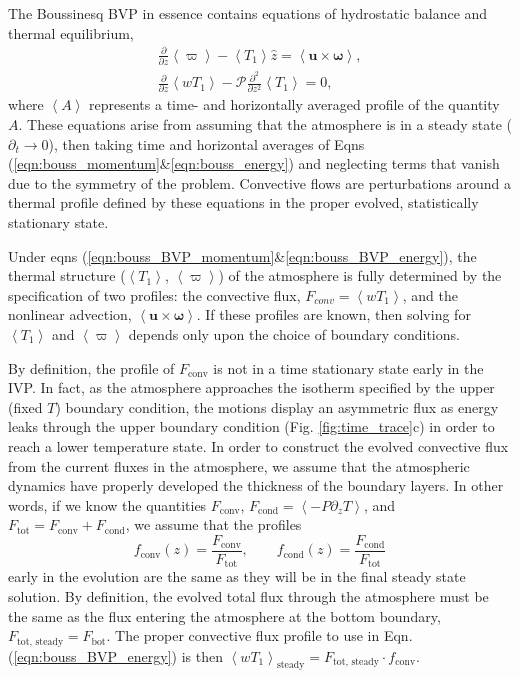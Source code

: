 \documentclass[aps, pre, onecolumn, nofootinbib, notitlepage, groupedaddress, amsfonts, amssymb, amsmath, longbibliography]{revtex4-1}
\newcommand{\angles}[1]{\ensuremath{\left\langle #1 \right\rangle}}
\begin{document}
The Boussinesq BVP in essence contains equations of hydrostatic balance and thermal equilibrium,
\begin{gather}
\frac{\partial}{\partial z}\angles{\varpi} - \angles{T_1}\hat{z} = \angles{\bm{u}\times\bm{\omega}},
	\label{eqn:bouss_BVP_momentum}
\\
\frac{\partial}{\partial z}\angles{wT_1} - \mathcal{P}\frac{\partial^2}{\partial z^2} \angles{T_1} = 0,
	\label{eqn:bouss_BVP_energy}
\end{gather}
where $\angles{A}$ represents a time- and horizontally averaged profile of the quantity $A$.  
These
equations arise from assuming that the atmosphere is in a steady state ($\partial_t \rightarrow 0$),
then taking time and horizontal averages of Eqns (\ref{eqn:bouss_momentum}\&\ref{eqn:bouss_energy}) and
neglecting terms that vanish due to the symmetry of the problem.
Convective flows
are perturbations around a thermal profile defined by these equations in the proper evolved, statistically stationary state.

Under eqns (\ref{eqn:bouss_BVP_momentum}\&\ref{eqn:bouss_BVP_energy}), 
the thermal structure ($\angles{T_1}$, $\angles{\varpi}$) of the atmosphere is fully determined by the specification
of two profiles: the convective flux, $F_{conv} = \angles{w T_1}$, and the nonlinear advection, $\angles{\bm{u}\times\bm{\omega}}$.  
If these profiles are known, then 
solving for $\angles{T_1}$ and
$\angles{\varpi}$ depends only upon the choice of boundary conditions.

By definition, the profile of $F_{\text{conv}}$ is not in a time stationary state early in the IVP.  
In fact, as the atmosphere approaches the
isotherm specified by the upper (fixed $T$) boundary condition, the motions display an asymmetric flux as energy
leaks through the upper boundary condition (Fig. \ref{fig:time_trace}c) in order to reach a lower temperature state.
In order to construct the evolved convective flux from the current fluxes in the atmosphere,
we assume that the atmospheric dynamics have properly developed the thickness of the boundary layers.
In other words, if we know the quantities $F_{\text{conv}}$, $F_{\text{cond}} = \angles{-P \partial_z T}$,
and $F_{\text{tot}} = F_{\text{conv}} + F_{\text{cond}}$, we assume that the profiles
\begin{equation}
f_{\text{conv}}(z) = \frac{F_{\text{conv}}}{F_{\text{tot}}},\qquad
f_{\text{cond}}(z) = \frac{F_{\text{cond}}}{F_{\text{tot}}}
\label{eqn:bvp_ratios}
\end{equation}
early in the evolution are the same as they will be in the final steady state solution. By definition, the
evolved total flux through the atmosphere must be the same as the flux entering the atmosphere at the
bottom boundary, $F_{\text{tot, steady}} = F_{\text{bot}}$.  The proper convective flux profile to use in
Eqn. (\ref{eqn:bouss_BVP_energy}) is then 
$\angles{w T_1}_{\text{steady}} = F_{\text{tot, steady}} \cdot f_{\text{conv}}$.  
\end{document}
